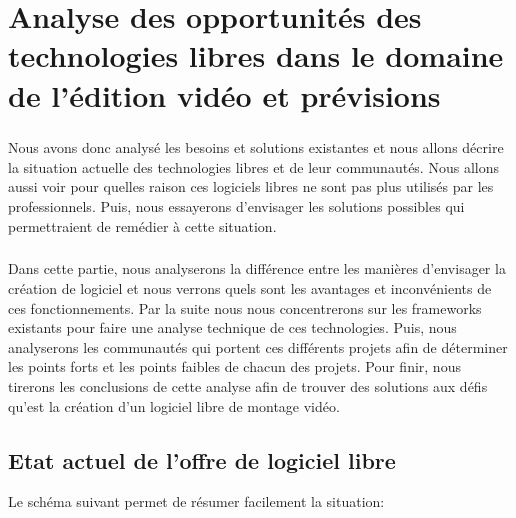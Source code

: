 \onehalfspacing \chapter{Analyse des opportunités des technologies
libres dans le domaine de l'édition vidéo et prévisions}

\minitoc \newpage

\doublespace

\paragraph{}

Nous avons donc analysé les besoins et solutions existantes et nous
allons décrire la situation actuelle des technologies libres et de leur
communautés.  Nous allons aussi voir pour quelles raison ces logiciels
libres ne sont pas plus utilisés par les professionnels. Puis, nous
essayerons d'envisager les solutions possibles qui permettraient de
remédier à cette situation.

\paragraph{}

Dans cette partie, nous analyserons la différence entre les manières
d'envisager la création de logiciel et nous verrons quels sont les
avantages et inconvénients de ces fonctionnements. Par la suite nous
nous concentrerons sur les frameworks existants pour faire une analyse
technique de ces technologies. Puis, nous analyserons les communautés
qui portent ces différents projets afin de déterminer les points forts
et les points faibles de chacun des projets.  Pour finir, nous tirerons
les conclusions de cette analyse afin de trouver des solutions aux défis
qu'est la création d'un logiciel libre de montage vidéo.

\newpage

\section {Etat actuel de l'offre de logiciel libre}

Le schéma suivant permet de résumer facilement la situation:


